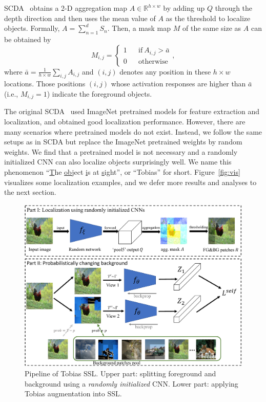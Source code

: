\documentclass[letterpaper]{article}
\begin{document}
SCDA~\citep{scda:tip17} obtains a 2-D aggregation map $A\in{\mathbb{R}^{h\times{w}}}$ by adding up $Q$ through the depth direction and then uses the mean value of $A$ as the threshold to localize objects. Formally, $A=\sum_{n=1}^d{S_n}$. Then, a mask map $M$ of the same size as $A$ can be obtained by
\begin{equation}
	M_{i,j} = \left\{
	\begin{array}{rcl}
		1&  & {\text{if}\ A_{i,j} > \bar{a}}\\
		0 && {\text{otherwise}}
	\end{array} \right. ,
\end{equation}
where $\bar{a}=\frac{1}{h\times{w}}\sum_{i,j}A_{i,j}$ and $(i,j)$ denotes any position in these $h\times{w}$ locations. Those positions $(i,j)$ whose activation responses are higher than $\bar{a}$ (i.e., $M_{i,j}=1$) indicate the foreground objects.

The original SCDA~\citep{scda:tip17} used ImageNet pretrained models for feature extraction and localization, and obtained good localization performance. However, there are many scenarios where pretrained models do not exist. Instead, we follow the same setups as in SCDA but replace the ImageNet pretrained weights by random weights. We find that a pretrained model is not necessary and a randomly initialized CNN can also localize objects surprisingly well. We name this phenomenon ``\underline{T}he \underline{ob}ject \underline{i}s at \underline{s}ight'', or ``Tobias'' for short. Figure~\ref{fig:vis} visualizes some localization examples, and we defer more results and analyses to the next section.

\begin{figure}[t]
	\centering
	\includegraphics[width=0.95\columnwidth]{network}
	\caption{Pipeline of Tobias SSL. Upper part: splitting foreground and background using a \textit{randomly initialized} CNN. Lower part: applying Tobias augmentation into SSL.}
	\label{fig:network}
\end{figure}
\end{document}
